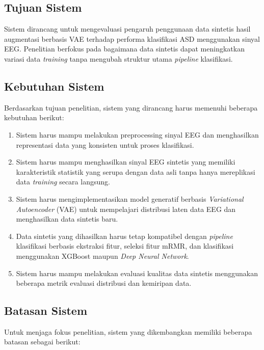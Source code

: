 \subsection{Tujuan Sistem}

Sistem dirancang untuk mengevaluasi pengaruh penggunaan data sintetis hasil augmentasi berbasis VAE terhadap performa klasifikasi ASD menggunakan sinyal EEG. Penelitian berfokus pada bagaimana data sintetis dapat meningkatkan variasi data \textit{training} tanpa mengubah struktur utama \textit{pipeline} klasifikasi.

\subsection{Kebutuhan Sistem}

Berdasarkan tujuan penelitian, sistem yang dirancang harus memenuhi beberapa kebutuhan berikut:

\begin{enumerate}
    \item Sistem harus mampu melakukan preprocessing sinyal EEG dan menghasilkan representasi data yang konsisten untuk proses klasifikasi.

    \item Sistem harus mampu menghasilkan sinyal EEG sintetis yang memiliki karakteristik statistik yang serupa dengan data asli tanpa hanya mereplikasi data \textit{training} secara langsung.

    \item Sistem harus mengimplementasikan model generatif berbasis \textit{Variational Autoencoder} (VAE) untuk mempelajari distribusi laten data EEG dan menghasilkan data sintetis baru.

    \item Data sintetis yang dihasilkan harus tetap kompatibel dengan \textit{pipeline} klasifikasi berbasis ekstraksi fitur, seleksi fitur mRMR, dan klasifikasi menggunakan XGBoost maupun \textit{Deep Neural Network}.

    \item Sistem harus mampu melakukan evaluasi kualitas data sintetis menggunakan beberapa metrik evaluasi distribusi dan kemiripan data.
\end{enumerate}

\subsection{Batasan Sistem}

Untuk menjaga fokus penelitian, sistem yang dikembangkan memiliki beberapa batasan sebagai berikut:


